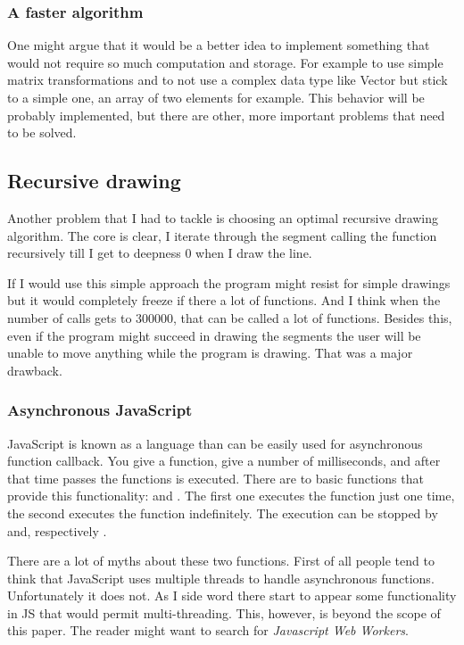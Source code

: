         \subsubsection{A faster algorithm}

            One might argue that it would be a better idea to implement something that would not require so much computation and storage.
            For example to use simple matrix transformations and to not use a complex data type like Vector but stick to a simple one, an array of two elements for example.
            This behavior will be probably implemented, but there are other, more important problems that need to be solved. 

    \subsection{Recursive drawing}

        Another problem that I had to tackle is choosing an optimal recursive drawing algorithm.
        The core is clear, I iterate through the segment calling the function recursively till I get to deepness 0 when I draw the line.

        If I would use this simple approach the program might resist for simple drawings but it would completely freeze if there a lot of functions.
        And I think when the number of calls gets to 300000, that can be called a lot of functions.
        Besides this, even if the program might succeed in drawing the segments the user will be unable to move anything while the program is drawing.
        That was a major drawback.

        \subsubsection{Asynchronous JavaScript}

            JavaScript is known as a language than can be easily used for asynchronous function callback.
            You give a function, give a number of milliseconds, and after that time passes the functions is executed.
            There are to basic functions that provide this functionality:  and .
            The first one executes the function just one time, the second executes the function indefinitely.
            The execution can be stopped by  and, respectively .

            There are a lot of myths about these two functions.
            First of all people tend to think that JavaScript uses multiple threads to handle asynchronous functions. 
            Unfortunately it does not. 
            As I side word there start to appear some functionality in JS that would permit multi-threading.
            This, however, is beyond the scope of this paper.
            The reader might want to search for \emph{Javascript Web Workers}.

